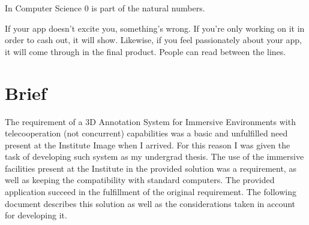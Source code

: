 
\begin{savequote}[10pc]
\sffamily
In Computer Science 0 is part of the natural numbers.
\end{savequote}


If your app doesn't excite you, something's wrong. If you're only working on it in order to cash out, it will show. Likewise, if you feel passionately about your app, it will come through in the final product. People can read between the lines.
\chapter{Brief}
The requirement of a 3D Annotation System for Immersive Environments with telecooperation (not concurrent) capabilities was a basic and unfulfilled need present at the Institute Image when I arrived. For this reason I was given the task of developing such system as my undergrad thesis. The use of the immersive facilities present at the Institute in the provided solution was a requirement, as well as keeping the compatibility with standard computers. The provided application succeed in the fulfillment of the original requirement. The following document describes this solution as well as the considerations taken in account for developing it.